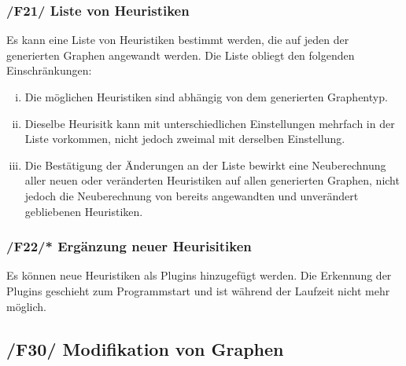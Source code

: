\documentclass{article}
\begin{document}
	\subsubsection*{/F21/ Liste von Heuristiken} \label{f21} 
	Es kann eine Liste von Heuristiken bestimmt werden, die auf jeden der generierten Graphen angewandt werden. Die Liste obliegt den folgenden Einschränkungen:
	\begin{enumerate}[i)]
		\item{Die möglichen Heuristiken sind abhängig von dem generierten Graphentyp.}
		\item{Dieselbe Heurisitk kann mit unterschiedlichen Einstellungen mehrfach in der Liste vorkommen, nicht jedoch zweimal mit derselben Einstellung.}
		\item{Die Bestätigung der Änderungen an der Liste bewirkt eine Neuberechnung aller neuen oder veränderten Heuristiken auf allen generierten Graphen, nicht jedoch die Neuberechnung von bereits angewandten und unverändert gebliebenen Heuristiken.}
	\end{enumerate}
	
	\subsubsection*{/F22/* Ergänzung neuer Heurisitiken} \label{f22} 
	Es können neue Heuristiken als Plugins hinzugefügt werden. Die Erkennung der Plugins geschieht zum Programmstart und ist während der Laufzeit nicht mehr möglich.
	
	
	\newpage
	
	\subsection*{/F30/ Modifikation von Graphen} \label{f30} 
\end{document}

